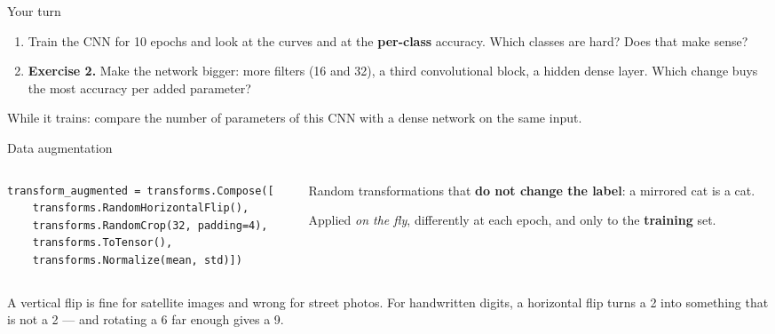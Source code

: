 \documentclass[aspectratio=169,10pt]{beamer}
\begin{document}
\begin{frame}{Your turn}
\begin{practice}
\begin{enumerate}
  \item Train the CNN for 10 epochs and look at the curves and at the \textbf{per-class}
        accuracy. Which classes are hard? Does that make sense?
  \item \textbf{Exercise 2.} Make the network bigger: more filters (16 and 32), a third
        convolutional block, a hidden dense layer. Which change buys the most accuracy per
        added parameter?
\end{enumerate}
\vspace{.2em}
While it trains: compare the number of parameters of this CNN with a dense network on the
same input.
\end{practice}
\end{frame}

\begin{frame}[fragile]{Data augmentation}
\begin{columns}[T]
\begin{column}{.52\textwidth}
\begin{lstlisting}
transform_augmented = transforms.Compose([
    transforms.RandomHorizontalFlip(),
    transforms.RandomCrop(32, padding=4),
    transforms.ToTensor(),
    transforms.Normalize(mean, std)])
\end{lstlisting}
\end{column}
\begin{column}{.45\textwidth}
\small
Random transformations that \textbf{do not change the label}: a mirrored cat is a cat.

\medskip
Applied \emph{on the fly}, differently at each epoch, and only to the \textbf{training}
set.
\end{column}
\end{columns}
\vspace{.4em}
\begin{warnbox}
A vertical flip is fine for satellite images and wrong for street photos. For handwritten
digits, a horizontal flip turns a 2 into something that is not a 2 --- and rotating a 6 far
enough gives a 9.
\end{warnbox}
\end{frame}
\end{document}
